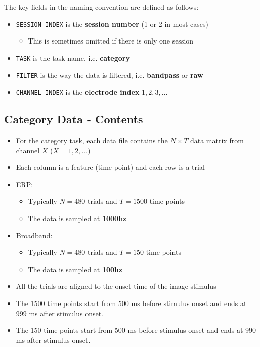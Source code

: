 \documentclass[11pt]{article}
\begin{document}
The key fields in the naming convention are defined as follows:
\begin{itemize}
\item \texttt{SESSION\_INDEX} is the \textbf{session number} (1 or 2 in most cases)
\begin{itemize}
\item This is sometimes omitted if there is only one session
\end{itemize}
\item \texttt{TASK} is the task name, i.e. \textbf{category}
\item \texttt{FILTER} is the way the data is filtered, i.e. \textbf{bandpass} or \textbf{raw}
\item \texttt{CHANNEL\_INDEX} is the \textbf{electrode index} \(1,2,3, \ldots\)
\end{itemize}

\subsection{Category Data - Contents}
\label{sec:org4fa8e66}

\begin{itemize}
\item For the category task, each data file contains the \(N \times T\) data matrix from channel \(X\) (\(X = 1, 2, \ldots\))
\item Each column is a feature (time point) and each row is a trial
\item ERP:
\begin{itemize}
\item Typically \(N = 480\) trials and \(T = 1500\) time points
\item The data is sampled at \textbf{1000hz}
\end{itemize}
\item Broadband:
\begin{itemize}
\item Typically \(N = 480\) trials and \(T = 150\) time points
\item The data is sampled at \textbf{100hz}
\end{itemize}
\item All the trials are aligned to the onset time of the image stimulus
\item The 1500 time points start from 500 ms before stimulus onset and ends at 999 ms after stimulus onset.
\item The 150 time points start from 500 ms before stimulus onset and ends at 990 ms after stimulus onset.
\end{itemize}
\end{document}
